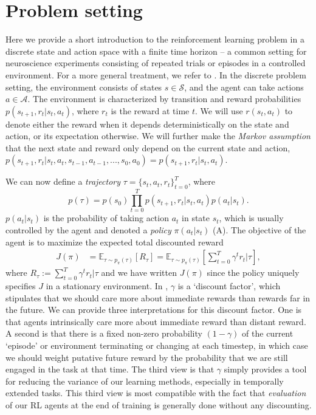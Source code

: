 \section{Problem setting}
\label{sec:problem_setting}

Here we provide a short introduction to the reinforcement learning problem in a discrete state and action space with a finite time horizon -- a common setting for neuroscience experiments consisting of repeated trials or episodes in a controlled environment.
For a more general treatment, we refer to \citet{sutton2018reinforcement}.
In the discrete problem setting, the environment consists of states $s \in \mathcal{S}$, and the agent can take actions $a \in \mathcal{A}$.
The environment is characterized by transition and reward probabilities $p(s_{t+1}, r_t | s_t, a_t)$, where $r_t$ is the reward at time $t$.
We will use $r(s_t, a_t)$ to denote either the reward when it depends deterministically on the state and action, or its expectation otherwise.
We will further make the \emph{Markov assumption} that the next state and reward only depend on the current state and action, $p(s_{t+1}, r_t | s_t, a_t, s_{t-1}, a_{t-1}, ..., s_0, a_0) = p(s_{t+1}, r_t | s_t, a_t)$.



We can now define a \emph{trajectory} $\tau = \{ s_t, a_t, r_t \}_{t = 0}^T$, where
\begin{equation}
    p(\tau) = p(s_0) \prod_{t = 0}^T p(s_{t+1}, r_t | s_t, a_t) p(a_t|s_t).
\end{equation}
$p(a_t|s_t)$ is the probability of taking action $a_t$ in state $s_t$, which is usually controlled by the agent and denoted a \emph{policy} $\pi(a_t|s_t)$ (A).
The objective of the agent is to maximize the expected total discounted reward
\begin{align}
    \label{eq:RL_objective}
    J(\pi) &= \mathbb{E}_{\tau \sim p_\pi(\tau)} \left [ R_\tau \right ] = \mathbb{E}_{\tau \sim p_\pi(\tau)} \left [ \sum_{t=0}^T \gamma^t r_t | \tau \right ],
\end{align}
where $R_\tau := \sum_{t=0}^T \gamma^t r_t | \tau$ and we have written $J(\pi)$ since the policy uniquely specifies $J$ in a stationary environment.
In , $\gamma$ is a `discount factor', which stipulates that we should care more about immediate rewards than rewards far in the future.
We can provide three interpretations for this discount factor.
One is that agents intrinsically care more about immediate reward than distant reward.
A second is that there is a fixed non-zero probability $(1-\gamma)$ of the current `episode' or environment terminating or changing at each timestep, in which case we should weight putative future reward by the probability that we are still engaged in the task at that time.
The third view is that $\gamma$ simply provides a tool for reducing the variance of our learning methods, especially in temporally extended tasks.
This third view is most compatible with the fact that \emph{evaluation} of our RL agents at the end of training is generally done without any discounting.

